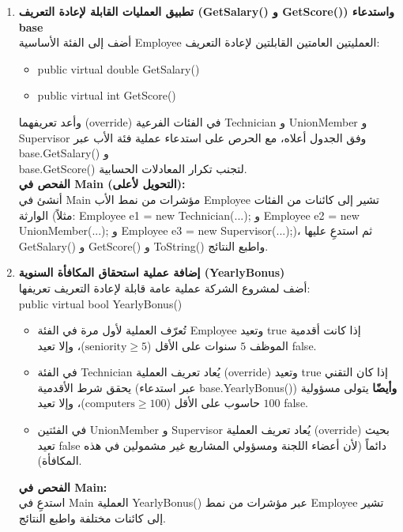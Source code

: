\documentclass[14pt]{extarticle}
\begin{document}
\filbreak

\begin{enumerate}[label=\textbf{تمرين \arabic*:}, wide=0pt, itemsep=2.2em]

    \item \textbf{تطبيق العمليات القابلة لإعادة التعريف (\textenglish{GetSalary()} و \textenglish{GetScore()}) واستدعاء \textenglish{base}} \\
    أضف إلى الفئة الأساسية \textenglish{Employee} العمليتين العامتين القابلتين لإعادة التعريف:
    \begin{itemize}
        \item \textenglish{public virtual double GetSalary()}
        \item \textenglish{public virtual int GetScore()}
    \end{itemize}
    وأعد تعريفهما (\textenglish{override}) في الفئات الفرعية \textenglish{Technician} و \textenglish{UnionMember} و \textenglish{Supervisor} وفق الجدول أعلاه، مع الحرص على استدعاء عملية فئة الأب عبر \textenglish{base.GetSalary()} و \\ \textenglish{base.GetScore()} لتجنب تكرار المعادلات الحسابية. \\
    \textbf{الفحص في \textenglish{Main} (التحويل لأعلى):} \\
    أنشئ في \textenglish{Main} مؤشرات من نمط الأب \textenglish{Employee} تشير إلى كائنات من الفئات الوارثة (مثلاً: \textenglish{Employee e1 = new Technician(...);} و \textenglish{Employee e2 = new UnionMember(...);} و \textenglish{Employee e3 = new Supervisor(...);})، ثم استدعِ عليها \textenglish{GetSalary()} و \textenglish{GetScore()} و \textenglish{ToString()} واطبع النتائج.
    \filbreak

    \item \textbf{إضافة عملية استحقاق المكافأة السنوية (\textenglish{YearlyBonus})} \\
    أضف لمشروع الشركة عملية عامة قابلة لإعادة التعريف تعريفها: \\
    \textenglish{public virtual bool YearlyBonus()}
    \begin{itemize}
        \item تُعرّف العملية لأول مرة في الفئة \textenglish{Employee} وتعيد \textenglish{true} إذا كانت أقدمية الموظف $5$ سنوات على الأقل ($\text{seniority} \ge 5$)، وإلا تعيد \textenglish{false}.
        \item في الفئة \textenglish{Technician} يُعاد تعريف العملية (\textenglish{override}) وتعيد \textenglish{true} إذا كان التقني يحقق شرط الأقدمية (عبر استدعاء \textenglish{base.YearlyBonus()}) \textbf{وأيضًا} يتولى مسؤولية $100$ حاسوب على الأقل ($\text{computers} \ge 100$)، وإلا تعيد \textenglish{false}.
        \item في الفئتين \textenglish{UnionMember} و \textenglish{Supervisor} يُعاد تعريف العملية (\textenglish{override}) بحيث تعيد \textenglish{false} دائماً (لأن أعضاء اللجنة ومسؤولي المشاريع غير مشمولين في هذه المكافأة).
    \end{itemize}
    \textbf{الفحص في \textenglish{Main}:} \\
    استدعِ في \textenglish{Main} العملية \textenglish{YearlyBonus()} عبر مؤشرات من نمط \textenglish{Employee} تشير إلى كائنات مختلفة واطبع النتائج.
    \filbreak


\end{enumerate}
\end{document}
